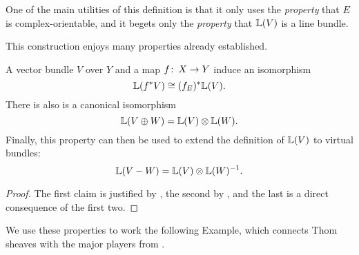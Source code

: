 \begin{remark}
One of the main utilities of this definition is that it only uses the \emph{property} that $E$ is complex-orientable, and it begets only the \emph{property} that $\mathbb{L}(V)$ is a line bundle.
\end{remark}

This construction enjoys many properties already established.
\begin{corollary}\label{PropertiesOfThomSheaves}
A vector bundle $V$ over $Y$ and a map $f \colon\thinspace X \to Y$ induce an isomorphism \[\mathbb{L}(f^* V) \cong (f_E)^* \mathbb{L}(V).\]  There is also is a canonical isomorphism \[\mathbb{L}(V \oplus W) = \mathbb{L}(V) \otimes \mathbb{L}(W).\]  Finally, this property can then be used to extend the definition of $\mathbb{L}(V)$ to virtual bundles: \[\mathbb{L}(V - W) = \mathbb{L}(V) \otimes \mathbb{L}(W)^{-1}.\]
\end{corollary}
\begin{proof}
The first claim is justified by , the second by , and the last is a direct consequence of the first two.
\end{proof}

We use these properties to work the following Example, which connects Thom sheaves with the major players from .

